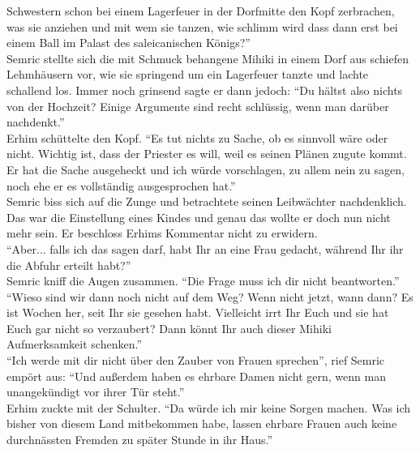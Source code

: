 Schwestern schon bei einem Lagerfeuer in der Dorfmitte den Kopf zerbrachen, was sie anziehen und 
mit wem sie tanzen, wie schlimm wird dass dann erst bei einem Ball im Palast des saleicanischen 
Königs?''\\
Semric stellte sich die mit Schmuck behangene Mihiki in einem Dorf aus schiefen Lehmhäusern vor, 
wie sie springend um ein Lagerfeuer tanzte und lachte schallend los. Immer noch grinsend sagte er 
dann jedoch: ``Du hältst also nichts von der Hochzeit? Einige Argumente sind recht schlüssig, wenn 
man darüber nachdenkt.''\\
Erhim schüttelte den Kopf. ``Es tut nichts zu Sache, ob es sinnvoll wäre oder nicht. Wichtig ist, 
dass der Priester es will, weil es seinen Plänen zugute kommt. Er hat die Sache ausgeheckt und ich 
würde vorschlagen, zu allem nein zu sagen, noch ehe er es vollständig ausgesprochen hat.''\\
Semric biss sich auf die Zunge und betrachtete seinen Leibwächter nachdenklich. Das war die 
Einstellung eines Kindes und genau das wollte er doch nun nicht mehr sein. Er beschloss Erhims 
Kommentar nicht zu erwidern.\\
``Aber... falls ich das sagen darf, habt Ihr an eine Frau gedacht, während Ihr ihr die Abfuhr 
erteilt habt?''\\
Semric kniff die Augen zusammen. ``Die Frage muss ich dir nicht beantworten.''\\
``Wieso sind wir dann noch nicht auf dem Weg? Wenn nicht jetzt, wann dann? Es ist Wochen her, seit 
Ihr sie gesehen habt. Vielleicht irrt Ihr Euch und sie hat Euch gar nicht so verzaubert? Dann könnt 
Ihr auch dieser Mihiki Aufmerksamkeit schenken.''\\
``Ich werde mit dir nicht über den Zauber von Frauen sprechen'', rief Semric empört aus: ``Und 
außerdem haben es ehrbare Damen nicht gern, wenn man unangekündigt vor ihrer Tür steht.''\\
Erhim zuckte mit der Schulter. ``Da würde ich mir keine Sorgen machen. Was ich bisher von diesem 
Land mitbekommen habe, lassen ehrbare Frauen auch keine durchnässten Fremden zu später Stunde in 
ihr Haus.''\\

